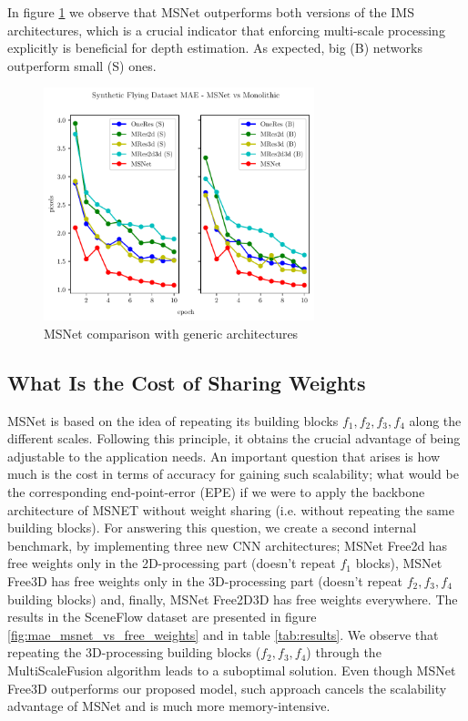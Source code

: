 \documentclass[runningheads]{llncs}
\begin{document}
In figure \ref{fig:mae_SFNvsGenericNets} we observe that MSNet outperforms both versions of the IMS architectures, which is a crucial indicator that enforcing multi-scale processing explicitly is beneficial for depth estimation. As expected, big (B) networks outperform small (S) ones.

\begin{figure}[!htbp]
    \centering
    \includegraphics[width=0.7\textwidth]{figures/freiburg_msnet_vs_monolithic_mae.pdf}
    \caption{MSNet comparison with generic architectures}
    \label{fig:mae_SFNvsGenericNets}
\end{figure}

\subsection{What Is the Cost of Sharing Weights}

MSNet is based on the idea of repeating its building blocks $f_1, f_2, f_3, f_4$ along the different scales. Following this principle, it obtains the crucial advantage of being adjustable to the application needs. An important question that arises is how much is the cost in terms of accuracy for gaining such scalability; what would be the corresponding end-point-error (EPE) if we were to apply the backbone architecture of MSNET without weight sharing (i.e. without repeating the same building blocks). For answering this question, we create a second internal benchmark, by implementing three new CNN architectures; MSNet Free2d has free weights only in the 2D-processing part (doesn't repeat $f_1$ blocks), MSNet Free3D has free weights only in the 3D-processing part (doesn't repeat $f_2, f_3, f_4$ building blocks) and, finally, MSNet Free2D3D has free weights everywhere. The results in the SceneFlow dataset are presented in figure \ref{fig:mae_msnet_vs_free_weights} and in table \ref{tab:results}. We observe that repeating the 3D-processing building blocks ($f_2, f_3, f_4$) through the MultiScaleFusion algorithm leads to a suboptimal solution. Even though MSNet Free3D outperforms our proposed model, such approach cancels the scalability advantage of MSNet and is much more memory-intensive.
\end{document}
